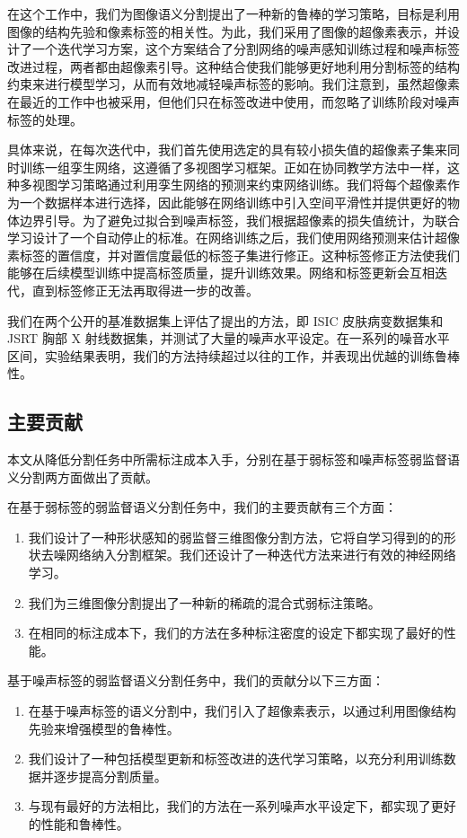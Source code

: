在这个工作中，我们为图像语义分割提出了一种新的鲁棒的学习策略，目标是利用图像的结构先验和像素标签的相关性。为此，我们采用了图像的超像素表示，并设计了一个迭代学习方案，这个方案结合了分割网络的噪声感知训练过程和噪声标签改进过程，两者都由超像素引导。这种结合使我们能够更好地利用分割标签的结构约束来进行模型学习，从而有效地减轻噪声标签的影响。我们注意到，虽然超像素在最近的工作中也被采用\citep{li2019supervised}，但他们只在标签改进中使用，而忽略了训练阶段对噪声标签的处理。

具体来说，在每次迭代中，我们首先使用选定的具有较小损失值的超像素子集来同时训练一组孪生网络，这遵循了多视图学习框架\citep{Han2018CoteachingRT,Wei2020CombatingNL}。正如在协同教学方法中一样，这种多视图学习策略通过利用孪生网络的预测来约束网络训练。我们将每个超像素作为一个数据样本进行选择，因此能够在网络训练中引入空间平滑性并提供更好的物体边界引导。为了避免过拟合到噪声标签，我们根据超像素的损失值统计，为联合学习设计了一个自动停止的标准。在网络训练之后，我们使用网络预测来估计超像素标签的置信度，并对置信度最低的标签子集进行修正。这种标签修正方法使我们能够在后续模型训练中提高标签质量，提升训练效果。网络和标签更新会互相迭代，直到标签修正无法再取得进一步的改善。

我们在两个公开的基准数据集上评估了提出的方法，即 ISIC 皮肤病变数据集\citep{Gutman2018SkinLA}和 JSRT 胸部 X 射线数据集\citep{Ginneken2006SegmentationOA,Shiraishi2000DevelopmentOA}，并测试了大量的噪声水平设定。在一系列的噪音水平区间，实验结果表明，我们的方法持续超过以往的工作，并表现出优越的训练鲁棒性。

\subsection{主要贡献}
本文从降低分割任务中所需标注成本入手，分别在基于弱标签和噪声标签弱监督语义分割两方面做出了贡献。

在基于弱标签的弱监督语义分割任务中，我们的主要贡献有三个方面：
\begin{enumerate}
\item 我们设计了一种形状感知的弱监督三维图像分割方法，它将自学习得到的的形状去噪网络纳入分割框架。我们还设计了一种迭代方法来进行有效的神经网络学习。
\item 我们为三维图像分割提出了一种新的稀疏的混合式弱标注策略。
\item 在相同的标注成本下，我们的方法在多种标注密度的设定下都实现了最好的性能。
\end{enumerate}


基于噪声标签的弱监督语义分割任务中，我们的贡献分以下三方面：
\begin{enumerate}
    \item 在基于噪声标签的语义分割中，我们引入了超像素表示，以通过利用图像结构先验来增强模型的鲁棒性。
    \item 我们设计了一种包括模型更新和标签改进的迭代学习策略，以充分利用训练数据并逐步提高分割质量。
    \item 与现有最好的方法相比，我们的方法在一系列噪声水平设定下，都实现了更好的性能和鲁棒性。
\end{enumerate}

